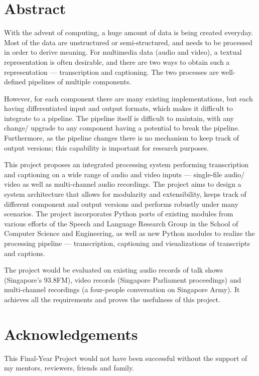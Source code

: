 \chapter*{Abstract}
With the advent of computing, a huge amount of data is being created everyday.
Most of the data are unstructured or semi-structured, and needs to be processed
in order to derive meaning. For multimedia data (audio and video), a textual
representation is often desirable, and there are two ways to obtain such a
representation --- transcription and captioning. The two processes are
well-defined pipelines of multiple components.

However, for each component there are many existing implementations, but each
having differentiated input and output formats, which makes it difficult to
integrate to a pipeline. The pipeline itself is difficult to maintain, with
any change/ upgrade to any component having a potential to break the pipeline.
Furthermore, as the pipeline changes there is no mechanism to keep track of
output versions; this capability is important for research purposes.

This project proposes an integrated processing system performing transcription
and captioning on a wide range of audio and video inputs --- single-file audio/
video as well as multi-channel audio recordings. The project aims to design
a system architecture that allows for modularity and extensibility, keeps track
of different component and output versions and performs robustly under many
scenarios. The project incorporates Python ports of existing modules from various
efforts of the Speech and Language Research Group in the School of Computer
Science and Engineering, as well as new Python modules to realize the processing
pipeline --- transcription, captioning and visualizations of transcripts and
captions.

The project would be evaluated on existing audio records of talk shows 
(Singapore's 93.8FM), video records (Singapore Parliament proceedings) and
multi-channel recordings (a four-people conversation on Singapore Army). It
achieves all the requirements and proves the usefulness of this project.

\newpage

\chapter*{Acknowledgements}
This Final-Year Project would not have been successful without the support
of my mentors, reviewers, friends and family.

